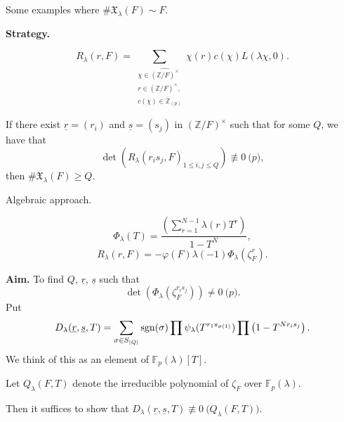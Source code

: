 \documentclass[reqno]{amsart} 
\begin{document}
\begin{remark}\label{remark:cnfg5j4wud}
  Some examples where $\# \mathfrak{X}_\lambda(F) \sim F$.
\end{remark}

\textbf{Strategy.}

\begin{equation*}
  R_\lambda(r, F) = \sum_{
    \substack{
      \chi \in \widehat{(\mathbb{Z} / F)^\times }  \\
      r \in(\mathbb{Z} / F)^\times, \\
      c(\chi) \in \overline{\mathbb{Z} }_{(p)}
    }
  }
  \chi(r) c(\chi ) L(\lambda \chi, 0).
\end{equation*}

\begin{fact}
  If there exist $\underline{r} =(r_i )$ and $\underline{s} =(s_j )$ in $(\mathbb{Z} / F)^\times$ such that for some $Q$, we have that
  \begin{equation*}
    \det \left( R_\lambda(r_i s_j , F) _{ 1 \leq i, j \leq Q} \right) \not \equiv 0 \pod{p},
  \end{equation*}
  then $\# \mathfrak{X}_\lambda(F) \geq Q$.
\end{fact}

Algebraic approach.

\begin{equation*}
  \Phi_\lambda(T) =
  \frac{\left(
    \sum_{r = 1 }^{N - 1}
  \lambda(r) T^r \right)}{1 - T^N},
\end{equation*}
\begin{equation*}
R_\lambda(r, F) = - \varphi(F) \lambda(- 1) \Phi_\lambda(\zeta_F^r).
\end{equation*}

\textbf{Aim.}  To find $Q$, $\underline{r}$, $\underline{s}$ such that
\begin{equation*}
  \det \left( \Phi_\lambda(\zeta_F^{r_i s_j }) \right) \neq 0 \pod{p}.
\end{equation*}
Put
\begin{equation*}
  D_\lambda(\underline{r}, \underline{s}, T)
  = \sum_{\sigma \in S_{\lvert Q \rvert}}
  \operatorname{sgn}(\sigma) \prod \psi_\lambda(T^{r_1 s_{\sigma(1)}})
  \prod \left( 1 - T^{N r_i s_j} \right).
\end{equation*}
We think of this as an element of $\mathbb{F}_p(\lambda) [T]$.

Let $Q_\lambda(F, T)$ denote the irreducible polynomial of $\zeta_F$ over $\mathbb{F}_p(\lambda)$.

Then it suffices to show that $D_\lambda(\underline{r}, \underline{s}, T) \not \equiv 0 \pod{Q_\lambda(F, T)}$.
\end{document}
